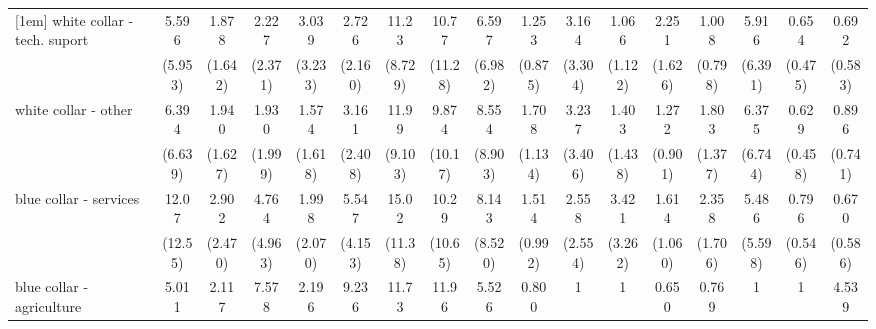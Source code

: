 {\begin{tabular}{l*{16}{c}}
[1em]
white collar - tech. suport&       5.596         &       1.878         &       2.227         &       3.039         &       2.726         &       11.23\sym{**} &       10.77\sym{*}  &       6.597         &       1.253         &       3.164         &       1.066         &       2.251         &       1.008         &       5.916         &       0.654         &       0.692         \\
                    &     (5.953)         &     (1.642)         &     (2.371)         &     (3.233)         &     (2.160)         &     (8.729)         &     (11.28)         &     (6.982)         &     (0.875)         &     (3.304)         &     (1.122)         &     (1.626)         &     (0.798)         &     (6.391)         &     (0.475)         &     (0.583)         \\
[1em]
white collar - other&       6.394         &       1.940         &       1.930         &       1.574         &       3.161         &       11.99\sym{**} &       9.874\sym{*}  &       8.554\sym{*}  &       1.708         &       3.237         &       1.403         &       1.272         &       1.803         &       6.375         &       0.629         &       0.896         \\
                    &     (6.639)         &     (1.627)         &     (1.999)         &     (1.618)         &     (2.408)         &     (9.103)         &     (10.17)         &     (8.903)         &     (1.134)         &     (3.406)         &     (1.438)         &     (0.901)         &     (1.377)         &     (6.744)         &     (0.458)         &     (0.741)         \\
[1em]
blue collar - services&       12.07\sym{*}  &       2.902         &       4.764         &       1.998         &       5.547\sym{*}  &       15.02\sym{***}&       10.29\sym{*}  &       8.143\sym{*}  &       1.514         &       2.558         &       3.421         &       1.614         &       2.358         &       5.486         &       0.796         &       0.670         \\
                    &     (12.55)         &     (2.470)         &     (4.963)         &     (2.070)         &     (4.153)         &     (11.38)         &     (10.65)         &     (8.520)         &     (0.992)         &     (2.554)         &     (3.262)         &     (1.060)         &     (1.706)         &     (5.598)         &     (0.546)         &     (0.586)         \\
[1em]
blue collar - agriculture&       5.011         &       2.117         &       7.578         &       2.196         &       9.236         &       11.73\sym{*}  &       11.96         &       5.526         &       0.800         &           1         &           1         &       0.650         &       0.769         &           1         &           1         &       4.539         \\

\end{tabular}}
